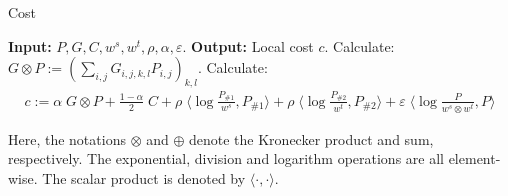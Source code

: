 \begin{algorithm}[t]
  \caption{Cost}
  \label{alg:local_cost}
  \begin{algorithmic}[1]
      \STATE \textbf{Input:} $P, G, C, w^s, w^t, \rho, \alpha, \varepsilon$.
      \STATE \textbf{Output:} Local cost $c$.
      \STATE Calculate: $G \otimes P := \left( \sum_{i,j} G_{i,j,k,l} P_{i,j} \right)_{k,l}$.
      \STATE Calculate:
      \begin{align}
          c := \alpha \; G \otimes P + \frac{1 - \alpha}{2} \; C +
          \rho \; \langle \log \frac{P_{\#1}}{w^s}, P_{\#1} \rangle +
          \rho \; \langle \log \frac{P_{\#2}}{w^t}, P_{\#2} \rangle +
          \varepsilon \; \langle \log \frac{P}{w^s \otimes w^t}, P \rangle
      \end{align}
  \end{algorithmic}
\end{algorithm}
Here, the notations $\otimes$ and $\oplus$ denote the Kronecker product and sum, respectively. The exponential, division and logarithm operations are all element-wise. The scalar product is denoted by $\langle \cdot, \cdot \rangle$.



